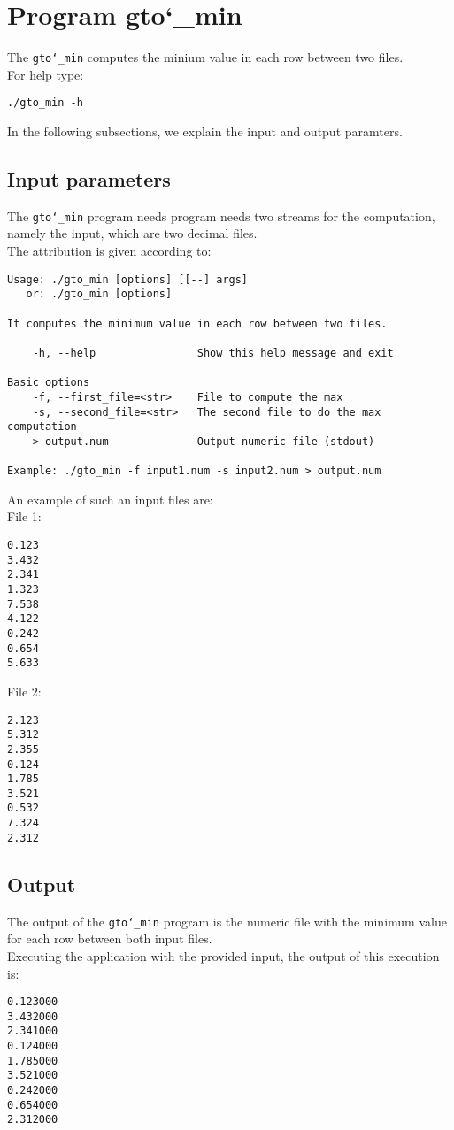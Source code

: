 \section{Program gto\char`_min}
The \texttt{gto\char`_min} computes the minium value in each row between two files.\\
For help type:
\begin{lstlisting}
./gto_min -h
\end{lstlisting}
In the following subsections, we explain the input and output paramters.

\subsection*{Input parameters}

The \texttt{gto\char`_min} program needs program needs two streams for the computation, namely the input, which are two decimal files.\\
The attribution is given according to:
\begin{lstlisting}
Usage: ./gto_min [options] [[--] args]
   or: ./gto_min [options]

It computes the minimum value in each row between two files.

    -h, --help                Show this help message and exit

Basic options
    -f, --first_file=<str>    File to compute the max
    -s, --second_file=<str>   The second file to do the max computation
    > output.num              Output numeric file (stdout)

Example: ./gto_min -f input1.num -s input2.num > output.num
\end{lstlisting}
An example of such an input files are:\\
File 1:
\begin{lstlisting}
0.123
3.432
2.341
1.323
7.538
4.122
0.242
0.654
5.633
\end{lstlisting}
File 2:
\begin{lstlisting}
2.123
5.312
2.355
0.124
1.785
3.521
0.532
7.324
2.312
\end{lstlisting}

\subsection*{Output}
The output of the \texttt{gto\char`_min} program is the numeric file with the minimum value for each row between both input files.\\
Executing the application with the provided input, the output of this execution is:
\begin{lstlisting}
0.123000
3.432000
2.341000
0.124000
1.785000
3.521000
0.242000
0.654000
2.312000
\end{lstlisting}